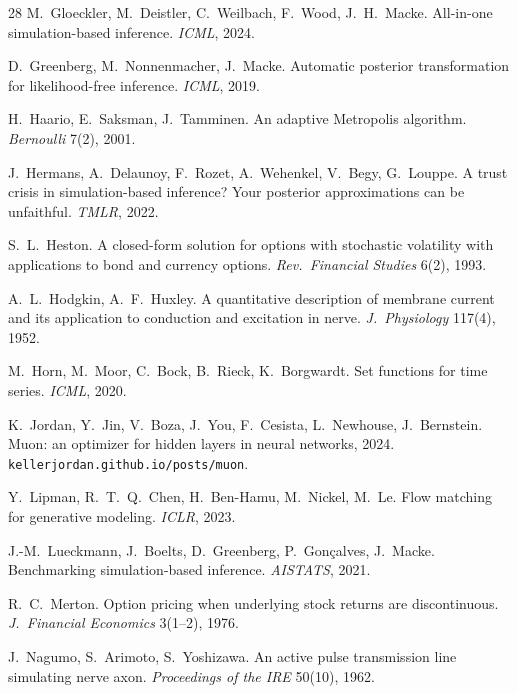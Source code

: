 \documentclass[10pt]{article}
\begin{document}
\begin{thebibliography}{28}
 M.~Gloeckler, M.~Deistler, C.~Weilbach, F.~Wood,
J.~H.~Macke. All-in-one simulation-based inference. \emph{ICML}, 2024.

 D.~Greenberg, M.~Nonnenmacher, J.~Macke.
Automatic posterior transformation for likelihood-free inference. \emph{ICML}, 2019.

 H.~Haario, E.~Saksman, J.~Tamminen.
An adaptive Metropolis algorithm. \emph{Bernoulli} 7(2), 2001.

 J.~Hermans, A.~Delaunoy, F.~Rozet, A.~Wehenkel,
V.~Begy, G.~Louppe. A trust crisis in simulation-based inference? Your posterior approximations can be
unfaithful. \emph{TMLR}, 2022.

 S.~L.~Heston. A closed-form solution for options with stochastic
volatility with applications to bond and currency options. \emph{Rev.\ Financial Studies} 6(2), 1993.

 A.~L.~Hodgkin, A.~F.~Huxley.
A quantitative description of membrane current and its application to conduction and excitation in
nerve. \emph{J.\ Physiology} 117(4), 1952.

 M.~Horn, M.~Moor, C.~Bock, B.~Rieck, K.~Borgwardt.
Set functions for time series. \emph{ICML}, 2020.

 K.~Jordan, Y.~Jin, V.~Boza, J.~You, F.~Cesista,
L.~Newhouse, J.~Bernstein. Muon: an optimizer for hidden layers in neural networks, 2024.
\texttt{kellerjordan.github.io/posts/muon}.

 Y.~Lipman, R.~T.~Q.~Chen, H.~Ben-Hamu, M.~Nickel, M.~Le.
Flow matching for generative modeling. \emph{ICLR}, 2023.

 J.-M.~Lueckmann, J.~Boelts, D.~Greenberg,
P.~Gon\c{c}alves, J.~Macke. Benchmarking simulation-based inference. \emph{AISTATS}, 2021.

 R.~C.~Merton. Option pricing when underlying stock returns are
discontinuous. \emph{J.\ Financial Economics} 3(1--2), 1976.

 J.~Nagumo, S.~Arimoto, S.~Yoshizawa. An active
pulse transmission line simulating nerve axon. \emph{Proceedings of the IRE} 50(10), 1962.


\end{thebibliography}
\end{document}

